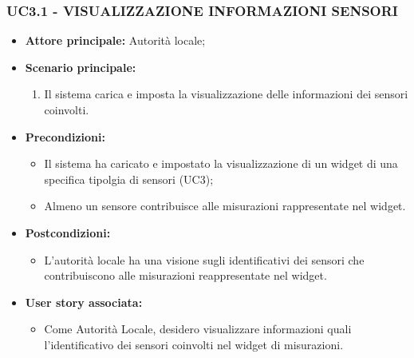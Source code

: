 \subsubsection{UC3.1 - VISUALIZZAZIONE INFORMAZIONI SENSORI}
\begin{itemize}
    \item \textbf{Attore principale:} Autorità locale;
    \item \textbf{Scenario principale:}
        \begin{enumerate}
            \item Il sistema carica e imposta la visualizzazione delle informazioni dei sensori coinvolti.
        \end{enumerate}
    \item \textbf{Precondizioni:}
        \begin{itemize}
            \item Il sistema ha caricato e impostato la visualizzazione di un widget di una specifica tipolgia di sensori (UC3);
            \item Almeno un sensore contribuisce alle misurazioni rappresentate nel widget.
        \end{itemize}
    \item \textbf{Postcondizioni:}
        \begin{itemize}
            \item  L'autorità locale ha una visione sugli identificativi dei sensori che contribuiscono alle misurazioni reappresentate nel widget.
        \end{itemize}
    \item \textbf{User story associata:}
        \begin{itemize}
            \item Come Autorità Locale, desidero visualizzare informazioni quali l'identificativo dei sensori coinvolti nel widget di misurazioni.
        \end{itemize}
\end{itemize}